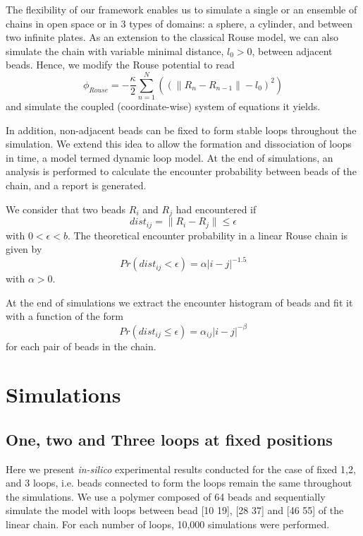 \documentclass[12pt]{paper}
\begin{document}
The flexibility of our framework enables us to simulate a single or an ensemble of chains in open space or in 3 types of domains: a sphere, a cylinder, and between two infinite plates. As an extension to the classical Rouse model, we can also simulate the chain with variable minimal distance, $l_0>0$, between adjacent beads. Hence, we modify the Rouse potential to read
\begin{equation*}
\phi_{Rouse}=-\frac{\kappa}{2}\sum_{n=1}^N\left((\|R_n-R_{n-1}\|-l_0)^2\right)
\end{equation*}
and simulate the coupled (coordinate-wise) system of equations it yields.

In addition, non-adjacent beads can be fixed to form stable loops throughout the simulation. We extend this idea to allow the formation and dissociation of loops in time, a model termed dynamic loop model.
At the end of simulations, an analysis is performed to calculate the encounter probability between beads of the chain, and a report is generated.  

We consider that two beads $R_i$ and $R_j$ had encountered if
\begin{equation*}
 dist_{ij}=\|R_i-R_j\|\leq \epsilon
\end{equation*}
with $0<\epsilon <b$. The theoretical encounter probability in a linear Rouse chain is given by 
\begin{equation}
Pr(dist_{ij}<\epsilon)= \alpha |i-j|^{-1.5}
\end{equation}
with $\alpha>0$. 

At the end of simulations we extract the encounter histogram of beads and fit it with a function of the form 
\begin{equation*}
Pr(dist_{ij}\leq \epsilon)=\alpha_{ij}|i-j|^{-\beta}
\end{equation*}
for each pair of beads in the chain. 

   
\section{Simulations}

\subsection{One, two and Three loops at fixed positions}
Here we present \textit{in-silico} experimental results conducted for the case of fixed 1,2, and 3 loops, i.e. beads connected to form the loops remain the same throughout the simulations. We use a polymer composed of 64 beads and sequentially simulate the model with loops between bead [10 19], [28 37] and  [46 55] of the linear chain. For each number of loops, 10,000 simulations were performed.
\end{document}
